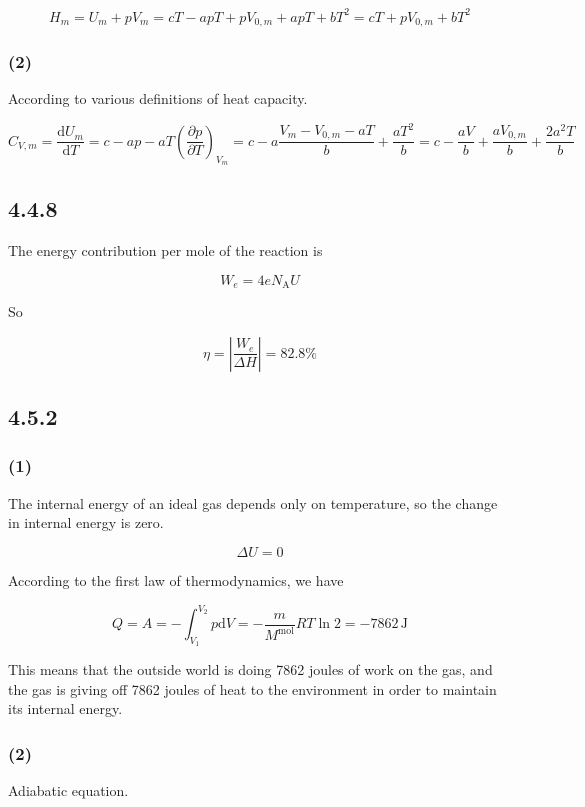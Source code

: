\documentclass[a4paper,11pt]{amsart}
\theoremstyle{definition}
\begin{document}
	$$
	H_m=U_m+pV_m=cT-apT+pV_{0,m}+apT+bT^2=cT+pV_{0,m}+bT^2
	$$
	
	\subsubsection*{(2)}
	
	According to various definitions of heat capacity.
	
	$$
	C_{V,m}=\frac{\mathrm{d}U_m}{\mathrm{d}T}=c-ap-aT\left( \frac{\partial p}{\partial T} \right) _{V_m}=c-a\frac{V_m-V_{0,m}-aT}{b}+\frac{aT^2}{b}=c-\frac{aV}{b}+\frac{aV_{0,m}}{b}+\frac{2a^2T}{b}
	$$
	
	\subsection*{4.4.8}
	
	The energy contribution per mole of the reaction is
	
	$$
	W_e=4eN_{\mathrm{A}}U
	$$
	
	So
	
	$$
	\eta =\left| \frac{W_e}{\Delta H} \right|=82.8\%
	$$
	
	
	\subsection*{4.5.2}
	
	\subsubsection*{(1)}
	
	The internal energy of an ideal gas depends only on temperature, so the change in internal energy is zero.
	
	$$
	\Delta U=0
	$$
	
	According to the first law of thermodynamics, we have
	
	$$
	Q=A=-\int_{V_1}^{V_2}{p\mathrm{d}V=-\frac{m}{M^{\mathrm{mol}}}RT\ln 2}=-7862\,\mathrm{J}
	$$
	
	This means that the outside world is doing 7862 joules of work on the gas, and the gas is giving off 7862 joules of heat to the environment in order to maintain its internal energy.
	
	\subsubsection*{(2)}
	
	Adiabatic equation.
	
\end{document}
